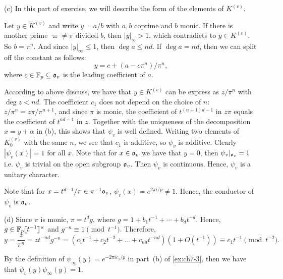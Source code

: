 \begin{solution}
  (c) In this part of exercise, we will describe the form of the elements of $K^{(v)}$.

  Let $y \in K ^ {(v)}$ and write $y = a / b$ with $a, b$ coprime and $b$ monic.
  If there is another prime $\varpi \neq \pi$ divided $b$, then $|y|_\varpi > 1$, which
  contradicts to $y \in K ^ {(v)}$. So $b = \pi ^ n$. And since $|y|_\infty \le 1$, then
  $\deg a \le n d$. If $\deg a = n d$, then we can split off the constant as follows:
  \[y = c + (a - c\pi ^ n)/ \pi^n, \]
  where $c \in \mathbb{F}_p \subseteq \mathfrak{o}_v$ is the leading coefficient of $a$.

  According to above discuss, we have that $y \in K^{(v)}$ can be express as $z / \pi ^ n$
  with $\deg z < n d$. The coefficient $c_1$ does not depend on the choice of $n$:
  $z / \pi^n = z\pi / \pi^{n+1}$, and since $\pi$ is monic, the coefficient of
  $t^{(n+1)d - 1}$ in $z\pi$ equals the coefficient of $t^{nd - 1}$ in $z$. Together with
  the uniqueness of the decomposition $x = y + \alpha$ in (b), this shows that $\psi_v$ is
  well defined. Writing two elements of $K^{(v)}_0$ with the same $n$, we see that $c_1$ is
  additive, so $\psi_v$ is additive. Clearly $|\psi_v(x)| = 1$ for all $x$.
  Note that for $x \in \mathfrak{o}_v$ we have that $y = 0$,
  then $\psi_v|_{\mathfrak{o}_v} = 1$ i.e. $\psi_v$ is trivial on the open subgroup
  $\mathfrak{o}_v$. Then $\psi_v$ is continuous. Hence, $\psi_v$ is a unitary character.

  Note that for $x = t^{d-1}/ \pi \in \pi^{-1} \mathfrak{o}_v$, $\psi_v (x) = e ^ {2 \pi i / p} \neq 1$. Hence, the conductor of
  $\psi_v$ is $\mathfrak{o}_v$.

  (d) Since $\pi$ is monic, $\pi = t ^ d g$, where $g = 1 + b_1 t ^{-1} + \cdots + b_d t ^ {-d}$.
  Hence, $g \in \mathbb{F}_p\llbracket t^{-1} \rrbracket^\times$ and $g ^ {-n} \equiv 1 \pmod{t^{-1}}$. Therefore,
  \[y=\frac{z}{\pi^n}=zt^{-nd}g^{-n}=(c_1t^{-1}+c_2t^{-2}+\dots+c_{nd}t^{-nd})
    (1+O(t^{-1}))\equiv c_1t^{-1}\pmod{t^{-2}}.\]

  By the definition of $\psi_\infty (y) = e ^ {-2 \pi i c_1 / p}$ in part~(b) of
  \cref{ex:ch7-3}, then we have that $\psi_v(y) \psi_\infty (y) = 1$.
\end{solution}
